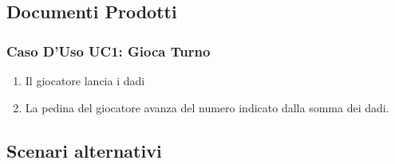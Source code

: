\documentclass{article}
\begin{document}
\subsection{Documenti Prodotti}
	
\subsubsection{Caso D'Uso UC1: Gioca Turno}
\begin{enumerate}
    \item Il giocatore lancia i dadi
    \item La pedina del giocatore avanza del numero indicato dalla somma dei dadi.
\end{enumerate}
\subsection{Scenari alternativi}
\end{document}

